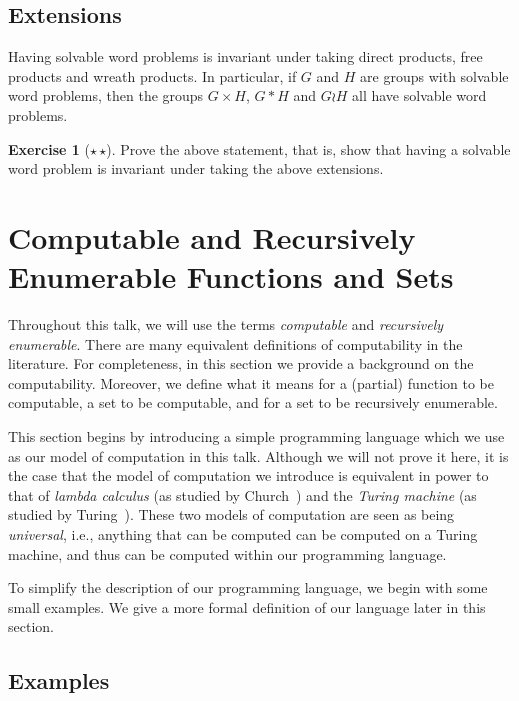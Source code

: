 \documentclass[11pt,a4paper,reqno]{amsart}
\theoremstyle{plain}
\theoremstyle{definition}
\theoremstyle{definition}
\newtheorem{exercise}[theorem]{Exercise}
\newcommand\exerciseLevelMedium{$\star${\,}$\star$}
\begin{document}
\subsection{Extensions}

Having solvable word problems is invariant under taking direct products, free products and wreath products.
In particular, if $G$ and $H$ are groups with solvable word problems, then the groups $G\times H$, $G*H$ and $G\wr H$ all have solvable word problems.

\begin{exercise}[\exerciseLevelMedium]
  Prove the above statement, that is, show that having a solvable word problem is invariant under taking the above extensions.
\end{exercise}

\section{Computable and Recursively Enumerable Functions and Sets}\label{sec:computable}

Throughout this talk, we will use the terms \emph{computable} and \emph{recursively enumerable}.
There are many equivalent definitions of computability in the literature.
For completeness, in this section we provide a background on the computability.
Moreover, we define what it means for a (partial) function to be computable, a set to be computable, and for a set to be recursively enumerable.

This section begins by introducing a simple programming language which we use as our model of computation in this talk.
Although we will not prove it here, it is the case that the model of computation we introduce is equivalent in power to that of \textit{lambda calculus} (as studied by Church~\cite{church1932}) and the \textit{Turing machine} (as studied by Turing~\cite{turing1936}).
These two models of computation are seen as being \textit{universal}, i.e., anything that can be computed can be computed on a Turing machine, and thus can be computed within our programming language.

To simplify the description of our programming language, we begin with some small examples.
We give a more formal definition of our language later in this section.

\subsection{Examples}
\end{document}
